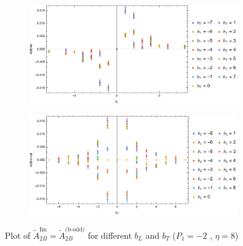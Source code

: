 \documentclass[]{article}
\numberwithin{equation}{section}
\newcommand{\tAmp}{\widetilde{A}}
\newcommand{\tAmp}{\ensuremath{\widetilde{A}^{(+)}}}
\begin{document}
\begin{figure}[h!]
     \centering
     \begin{subfigure}[b]{0.45\textwidth}
         \centering
         \includegraphics[width=\textwidth]{Amp_plots/bL_A2B_b_odd_P1_-2_eta_8.pdf}
     \end{subfigure}
     \begin{subfigure}[b]{0.45\textwidth}
         \centering
         \includegraphics[width=\textwidth]{Amp_plots/bT_A2B_b_odd_P1_-2_eta_8.pdf}
     \end{subfigure}
        \caption{Plot of  $\tAmp^{\text{Im}}_{2B}=\tAmp^{\text{(b-odd)}}_{2B}$ for different $b_{L}$ and $b_{T}$  ($P_{1} = -2$ , $\eta=8$)}
\end{figure}
\end{document}
